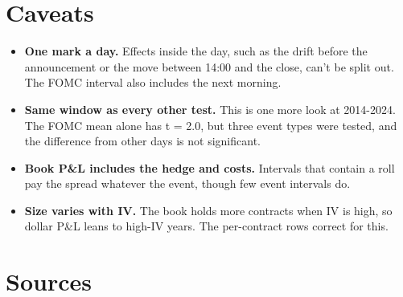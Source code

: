 \documentclass{article}
\begin{document}
\section{Caveats}

\begin{itemize}

\item \textbf{One mark a day.} Effects inside the day, such as the drift before the announcement or the move between 14:00 and the close, can't be split out. The FOMC interval also includes the next morning.

\item \textbf{Same window as every other test.} This is one more look at 2014-2024. The FOMC mean alone has t = 2.0, but three event types were tested, and the difference from other days is not significant.

\item \textbf{Book P\&L includes the hedge and costs.} Intervals that contain a roll pay the spread whatever the event, though few event intervals do.

\item \textbf{Size varies with IV.} The book holds more contracts when IV is high, so dollar P\&L leans to high-IV years. The per-contract rows correct for this.

\end{itemize}

\section{Sources}
\end{document}
